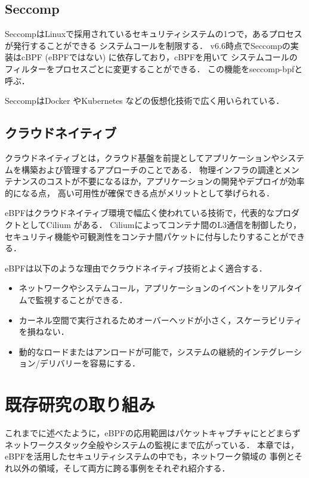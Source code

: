 \documentclass[platex,a4j,10pt,twoside,twocolumn,dvipdfmx]{jsarticle}
\begin{document}
  \subsection{Seccomp}
    SeccompはLinuxで採用されているセキュリティシステムの1つで，あるプロセスが発行することができる
    システムコールを制限する．
    v6.6時点でSeccompの実装はcBPF (eBPFではない) に依存しており，cBPFを用いて
    システムコールのフィルターをプロセスごとに変更することができる．
    この機能をseccomp-bpfと呼ぶ．
    
    SeccompはDocker \cite{Seccomps57:online} やKubernetes\cite{Configur55:online} などの仮想化技術で広く用いられている．
  
  \subsection{クラウドネイティブ}
    クラウドネイティブとは，クラウド基盤を前提としてアプリケーションやシステムを構築および管理するアプローチのことである．
    物理インフラの調達とメンテナンスのコストが不要になるほか，アプリケーションの開発やデプロイが効率的になる点，
    高い可用性が確保できる点がメリットとして挙げられる．
    
    eBPFはクラウドネイティブ環境で幅広く使われている技術で，代表的なプロダクトとしてCilium \cite{CiliumCl38:online}がある．
    Ciliumによってコンテナ間のL3通信を制御したり，セキュリティ機能や可観測性をコンテナ間パケットに付与したりすることができる．
    
    eBPFは以下のような理由でクラウドネイティブ技術とよく適合する．
    \begin{itemize}
      \item ネットワークやシステムコール，アプリケーションのイベントをリアルタイムで監視することができる．
      \item カーネル空間で実行されるためオーバーヘッドが小さく，スケーラビリティを損ねない．
      \item 動的なロードまたはアンロードが可能で，システムの継続的インテグレーション/デリバリーを容易にする．
    \end{itemize} 

\section{既存研究の取り組み}
  これまでに述べたように，eBPFの応用範囲はパケットキャプチャにとどまらず
  ネットワークスタック全般やシステムの監視にまで広がっている．
  本章では，eBPFを活用したセキュリティシステムの中でも，ネットワーク領域の
  事例とそれ以外の領域，そして両方に跨る事例をそれぞれ紹介する．
  
\end{document}

